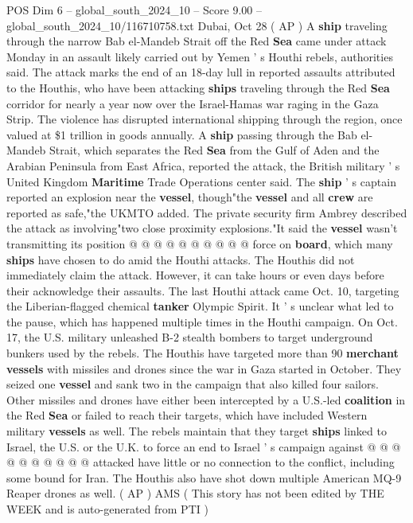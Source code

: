 \begin{textsample}{POS Dim 6 – global\_south\_2024\_10 – Score 9.00 – global\_south\_2024\_10/116710758.txt}  \label{ex:f6_pos_398}
Dubai, Oct 28 ( AP ) A \textbf{ship} traveling through the narrow Bab el-Mandeb Strait off the Red \textbf{Sea} came under attack Monday in an assault likely carried out by Yemen ' s Houthi rebels, authorities said.
The attack marks the end of an 18-day lull in reported assaults attributed to the Houthis, who have been attacking \textbf{ships} traveling through the Red \textbf{Sea} corridor for nearly a year now over the Israel-Hamas war raging in the Gaza Strip.
The violence has disrupted international shipping through the region, once valued at \$1 trillion in goods annually.
A \textbf{ship} passing through the Bab el-Mandeb Strait, which separates the Red \textbf{Sea} from the Gulf of Aden and the Arabian Peninsula from East Africa, reported the attack, the British military ' s United Kingdom \textbf{Maritime} Trade Operations center said.
The \textbf{ship} ' s captain reported an explosion near the \textbf{vessel}, though"the \textbf{vessel} and all \textbf{crew} are reported as safe,"the UKMTO added.
The private security firm Ambrey described the attack as involving"two close proximity explosions."It said the \textbf{vessel} wasn't transmitting its position @ @ @ @ @ @ @ @ @ @ force on \textbf{board}, which many \textbf{ships} have chosen to do amid the Houthi attacks.
The Houthis did not immediately claim the attack.
However, it can take hours or even days before their acknowledge their assaults.
The last Houthi attack came Oct. 10, targeting the Liberian-flagged chemical \textbf{tanker} Olympic Spirit.
It ' s unclear what led to the pause, which has happened multiple times in the Houthi campaign.
On Oct. 17, the U.S. military unleashed B-2 stealth bombers to target underground bunkers used by the rebels.
The Houthis have targeted more than 90 \textbf{merchant} \textbf{vessels} with missiles and drones since the war in Gaza started in October.
They seized one \textbf{vessel} and sank two in the campaign that also killed four sailors.
Other missiles and drones have either been intercepted by a U.S.-led \textbf{coalition} in the Red \textbf{Sea} or failed to reach their targets, which have included Western military \textbf{vessels} as well.
The rebels maintain that they target \textbf{ships} linked to Israel, the U.S. or the U.K. to force an end to Israel ' s campaign against @ @ @ @ @ @ @ @ @ @ attacked have little or no connection to the conflict, including some bound for Iran.
The Houthis also have shot down multiple American MQ-9 Reaper drones as well. ( AP ) AMS ( This story has not been edited by THE WEEK and is auto-generated from PTI )

\end{textsample}
